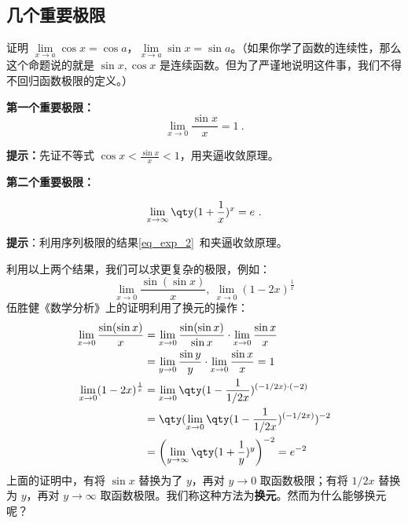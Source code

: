\subsection{几个重要极限}
\begin{exercise}{}
证明 $\lim\limits_{x\rightarrow a}\cos x=\cos a$，$\lim\limits_{x\rightarrow a}\sin x=\sin a$。（如果你学了函数的连续性，那么这个命题说的就是 $\sin x,\cos x$ 是连续函数。但为了严谨地说明这件事，我们不得不回归函数极限的定义。）
\end{exercise}

\textbf{第一个重要极限：}
\begin{equation}
\lim\limits_{x\rightarrow 0}\frac{\sin x}{x}=1~.
\end{equation}

\textbf{提示：}先证不等式 $\cos x<\frac{\sin x}{x}<1$，用夹逼收敛原理。

\textbf{第二个重要极限：}

\begin{equation}
\lim\limits_{x\rightarrow \infty} \qty(1+\frac{1}{x})^x=e~.
\end{equation}

\textbf{提示}：利用序列极限的结果\autoref{eq_exp_2}~和夹逼收敛原理。

利用以上两个结果，我们可以求更复杂的极限，例如：
\begin{equation}
\lim\limits_{x\rightarrow 0}\frac{\sin(\sin x)}{x},\ \lim\limits_{x\rightarrow 0}(1-2x)^{\frac{1}{x}}
\end{equation}
伍胜健《数学分析》上的证明利用了换元的操作：
\begin{equation}
\begin{aligned}
\lim\limits_{x\rightarrow 0}\frac{\sin(\sin x)}{x}&=\lim\limits_{x\rightarrow 0}\frac{\sin(\sin x)}{\sin x}\cdot \lim\limits_{x\rightarrow 0}\frac{\sin x}{x}\\
&=\lim\limits_{y\rightarrow 0}\frac{\sin y}{y}\cdot \lim\limits_{x\rightarrow 0}\frac{\sin x}{x}=1\\
\lim\limits_{x\rightarrow 0}(1-2x)^{\frac{1}{x}}&=\lim\limits_{x\rightarrow 0}\qty(1-\frac{1}{1/2x})^{(-1/2x)\cdot (-2)}\\&=\qty(\lim\limits_{x\rightarrow 0}\qty(1-\frac{1}{1/2x})^{(-1/2x)})^{-2}
\\&=\left(\lim\limits_{y\rightarrow \infty}\qty(1+\frac{1}{y})^{y}\right)^{-2}=e^{-2}
\end{aligned}
\end{equation}
上面的证明中，有将 $\sin x$ 替换为了 $y$，再对 $y\rightarrow 0$ 取函数极限；有将 $1/2x$ 替换为 $y$，再对 $y\rightarrow \infty$ 取函数极限。我们称这种方法为\textbf{换元}。然而为什么能够换元呢？

